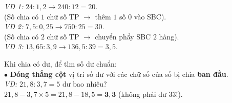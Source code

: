 \documentclass[14pt,a4paper,oneside]{extbook}
\begin{document}
\noindent
\begin{minipage}[t]{0.52\textwidth}
  \begin{tcolorbox}[
    enhanced,
    title={\footnotesize\bfseries\color{white}\faCut\ 2. Kỹ thuật bỏ dấu phẩy ở số chia},
    colback=teal!2!white,
    colframe=teal!75!black,
    arc=2.5mm, boxrule=0.8pt, top=1.8mm, bottom=1.8mm, left=2.2mm, right=2.2mm
  ]
    \footnotesize
    \textit{VD 1:} $24 : 1,2 \longrightarrow 240 : 12 = 20$.\\
    (Số chia có $1$ chữ số TP $\rightarrow$ thêm $1$ số $0$ vào SBC).\\
    \textit{VD 2:} $7,5 : 0,25 \longrightarrow 750 : 25 = 30$.\\
    (Số chia có $2$ chữ số TP $\rightarrow$ chuyển phẩy SBC $2$ hàng).\\
    \textit{VD 3:} $13,65 : 3,9 \longrightarrow 136,5 : 39 = 3,5$.
  \end{tcolorbox}
\end{minipage}%
\hfill
\begin{minipage}[t]{0.46\textwidth}
  \begin{tcolorbox}[
    enhanced,
    title={\footnotesize\bfseries\color{white}\faSearch\ 3. Xác định số dư chính xác},
    colback=purple!2!white,
    colframe=purple!70!black,
    arc=2.5mm, boxrule=0.8pt, top=1.8mm, bottom=1.8mm, left=2mm, right=2mm
  ]
    \footnotesize
    Khi chia có dư, để tìm số dư chuẩn:\\
    $\bullet$ \textbf{Dóng thẳng cột} vị trí số dư với các chữ số của số bị chia \textbf{ban đầu}.\\
    \textit{VD:} $21,8 : 3,7 = 5$ dư bao nhiêu?\\
    $21,8 - 3,7 \times 5 = 21,8 - 18,5 = \mathbf{3,3}$ (không phải dư $33$!).
  \end{tcolorbox}
\end{minipage}

\vspace{3mm}
\end{document}
